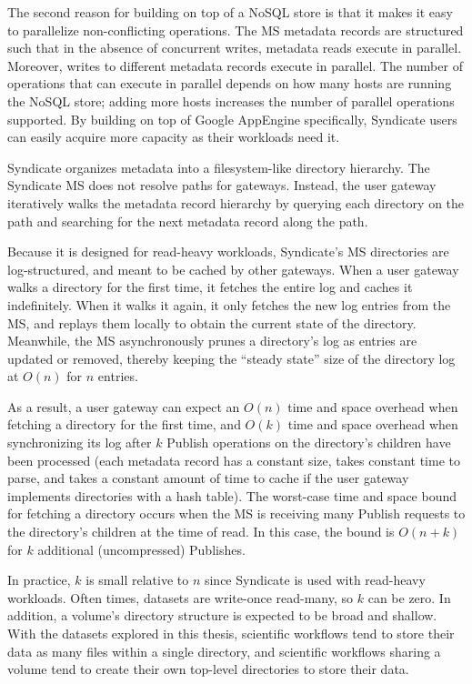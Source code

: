 The second reason for building on top of a NoSQL store is that it makes it easy
to parallelize non-conflicting operations.  The MS metadata records are
structured such that in the absence of concurrent writes,
metadata reads execute in parallel.  Moreover, writes to different metadata
records execute in parallel.  The number of operations that can execute in
parallel depends on how many hosts are running the NoSQL store; adding more
hosts increases the number of parallel operations supported.  By building on top
of Google AppEngine specifically, Syndicate users can easily acquire more capacity as
their workloads need it.

Syndicate organizes metadata into a filesystem-like directory hierarchy.
The Syndicate MS does not resolve paths for gateways.  Instead, the user
gateway iteratively walks the metadata record hierarchy by querying each
directory on the path and searching for the next metadata record along the path.

Because it is designed for read-heavy workloads, Syndicate's MS
directories are log-structured, and meant to be cached by 
other gateways.  When a user gateway walks a directory for the first time, it
fetches the entire log and caches it indefinitely.  When it walks it again, it
only fetches the new log entries from the MS, and replays them locally to obtain
the current state of the directory.  Meanwhile, the MS asynchronously
prunes a directory's log as entries are updated or removed, thereby keeping the
``steady state'' size of the directory log at $O(n)$ for $n$ entries.

As a result, a user gateway can expect an $O(n)$ time and space overhead when
fetching a directory for the first time, and $O(k)$ time and space overhead
when synchronizing its log after $k$ Publish operations on the directory's
children have been processed (each metadata record
has a constant size, takes constant time to parse, and takes a constant amount 
of time to cache if the user gateway implements directories with a hash table).
The worst-case time and space bound for fetching a directory occurs
when the MS is receiving many Publish requests to the directory's children
at the time of read.  In this case, the bound is $O(n+k)$ for $k$ additional
(uncompressed) Publishes.

In practice, $k$ is small relative to $n$ since Syndicate is used with
read-heavy workloads.  Often times, datasets are write-once read-many,
so $k$ can be zero.  In addition, a volume's directory structure is expected
to be broad and shallow.  With the datasets explored in this thesis,
scientific workflows tend to store their data as many files
within a single directory, and scientific workflows sharing a volume tend to
create their own top-level directories to store their data.


